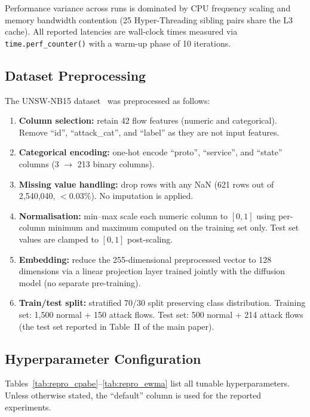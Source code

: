 \documentclass[lettersize,journal]{IEEEtran}
\begin{document}
Performance variance across runs is dominated by CPU frequency scaling
and memory bandwidth contention (25 Hyper-Threading sibling pairs share
the L3 cache). All reported latencies are wall-clock times measured via
\verb|time.perf_counter()| with a warm-up phase of 10 iterations.

\subsection{Dataset Preprocessing}

The UNSW-NB15 dataset~\cite{UNSWNB15} was preprocessed as follows:

\begin{enumerate}
    \item \textbf{Column selection:} retain 42 flow features (numeric
    and categorical). Remove ``id'', ``attack\_cat'', and ``label'' as
    they are not input features.
    \item \textbf{Categorical encoding:} one-hot encode ``proto'',
    ``service'', and ``state'' columns (3 $\to$ 213 binary columns).
    \item \textbf{Missing value handling:} drop rows with any NaN
    (621 rows out of 2,540,040, $<0.03\%$). No imputation is applied.
    \item \textbf{Normalisation:} min--max scale each numeric column to
    $[0,1]$ using per-column minimum and maximum computed on the
    training set only. Test set values are clamped to $[0,1]$ post-scaling.
    \item \textbf{Embedding:} reduce the 255-dimensional preprocessed
    vector to 128 dimensions via a linear projection layer trained
    jointly with the diffusion model (no separate pre-training).
    \item \textbf{Train/test split:} stratified 70/30 split preserving
    class distribution. Training set: 1,500 normal + 150 attack flows.
    Test set: 500 normal + 214 attack flows (the test set reported in
    Table~II of the main paper).
\end{enumerate}

\subsection{Hyperparameter Configuration}

Tables~\ref{tab:repro_cpabe}--\ref{tab:repro_ewma} list all tunable
hyperparameters. Unless otherwise stated, the ``default'' column
is used for the reported experiments.
\end{document}
